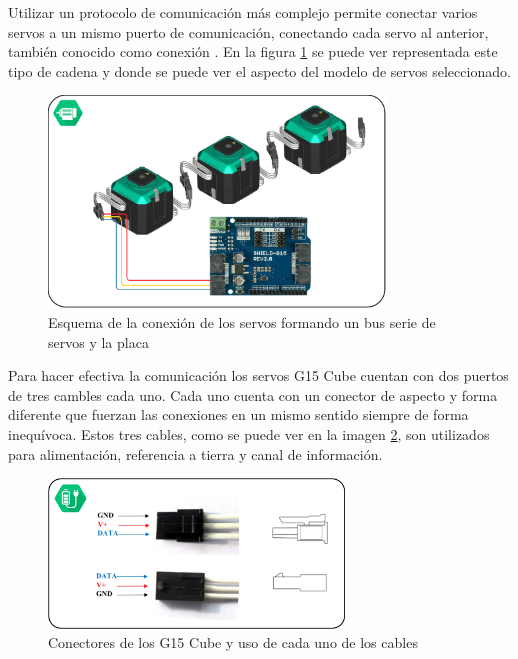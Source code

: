     Utilizar un protocolo de comunicación más complejo permite conectar varios servos a un mismo puerto de comunicación, conectando cada servo al anterior, también conocido como conexión . En la figura \ref{fig:Electronica:bus-servos} se puede ver representada este tipo de cadena y donde se puede ver el aspecto del modelo de servos seleccionado.
    \\
    
    \begin{figure}[H]
    	\centering
    	\includegraphics[width=0.8\textwidth]{figuras/Imagenes_Electronica/G15_bus_conection.jpg}
    	\caption{Esquema de la conexión de los servos formando un bus serie de servos y la placa }
    	\label{fig:Electronica:bus-servos}
    \end{figure}
    
    Para hacer efectiva la comunicación los servos G15 Cube cuentan con dos puertos de tres cambles cada uno. Cada uno cuenta con un conector de aspecto y forma diferente que fuerzan las conexiones en un mismo sentido siempre de forma inequívoca. Estos tres cables, como se puede ver en la imagen \ref{fig:Electronica:conectores-servos}, son utilizados para alimentación, referencia a tierra y canal de información.
    \\
    
    \begin{figure}[H]
    	\centering
    	\includegraphics[width=0.7\textwidth]{figuras/Imagenes_Electronica/conectores_servos.jpg}
    	\caption{Conectores de los G15 Cube y uso de cada uno de los cables}
    	\label{fig:Electronica:conectores-servos}
    \end{figure}
    
